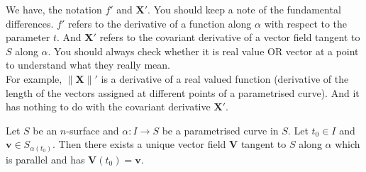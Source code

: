	We have, the notation $f'$ and $\boldsymbol{X}'$.
	You should keep a note of the fundamental differences.
	$f'$ refers to the derivative of a function along $\alpha$ with respect to the parameter $t$.
	And $\boldsymbol{X}'$ refers to the covariant derivative of a vector field tangent to $S$ along $\alpha$.
	You should always check whether it is real value OR vector at a point to understand what they really mean.\\

	
	For example, $\|\boldsymbol{X}\|'$ is a derivative of a real valued function (derivative of the length of the vectors assigned at different points of a parametrised curve).
	And it has nothing to do with the covariant derivative $\boldsymbol{X}'$.


\begin{theorem}
	Let $S$ be an $n$-surface and $\alpha : I \to S$ be a parametrised curve in $S$.
	Let $t_0 \in I$ and $\boldsymbol{v} \in S_{\alpha(t_0)}$.
	Then there exists a unique vector field $\boldsymbol{V}$ tangent to $S$ along $\alpha$ which is parallel and has $\boldsymbol{V}(t_0) = \boldsymbol{v}$.
\end{theorem}
